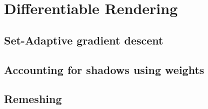 \chapter{Differentiable Rendering}
\label{chapter-framework}


\section{Set-Adaptive gradient descent}

\section{Accounting for shadows using weights}

\section{Remeshing}